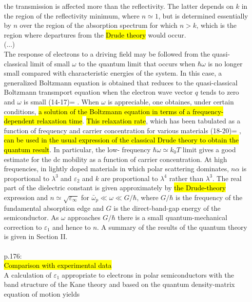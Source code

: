 the transmission is affected more than the reflectivity. The latter depends on
$k$ in the region of the reflectivity minimum, where $n \simeq 1$, but is determined 
essentially by $n$ over the region of the absorption spectrum for which $n > k$,
which is the region where departures from the \hl{Drude theory} would occur.
\\
(...)
\\
The response of electrons to a driving field may be followed from the quasi-classical
limit of small $\omega$ to the quantum limit that occurs when $\hbar \omega$ is no longer small
compared with characteristic energies of the system. In this case, a generalized Boltzmann equation
is obtained that reduces to the quasi-classical Boltzmann transmport equation when the electron wave 
vector $q$ tends to zero and $\omega$ is small (14-17)=
\cite{Jensen1975,Price1966,Argyres1961,Kohn1958}
. When $\omega$ is appreciable, one obtaines,
under certain conditions, \hl{a solution of the Boltzmann equation in terms of a frequency-dependent
relaxation time}. \hl{This relaxation rate}, which has been tabulated as a function of frequency and 
carrier concentration for various materials (18-20)=
\cite{Jensen1977,Jensen1979,Jensen1981}
, \hl{can be used in the usual expression of the 
classical Drude theory to obtain the quantum result}. In particular, the low-
frequency $\hbar\omega \simeq k_0T$ limit gives a good estimate for the dc mobility as a function
of carrier concentration. At high frequencies, in lightly doped materials in which
polar scattering dominates, $n\alpha$ is proportional to $\lambda^3$ and $\varepsilon_2$ and $k$
are proportional to $\lambda^4$ rather than $\lambda^3$. The real part of the dielectric constant
is given approximately by \hl{the Drude-theory} expression and $n \simeq \sqrt{\varepsilon_{\infty}}$
for $\bar\omega_p \ll \omega \ll G/\hbar$, where $G/\hbar$ is the frequency of the fundamental absorption
edge and $G$ is the direct-band-gap energy of the semiconductor. As $\omega$ approaches $G/\hbar$ there
is a small quantum-mechanical correction to $\varepsilon_1$ and hence to $n$.
A summary of the results of the quantum theory is given in Section II.
\\
\\
p.176:\\
\hl{Comparison with experimental data}\\
A calculation of $\varepsilon_1$ appropriate to electrons in polar semiconductors with the
band structure of the Kane theory and based on the quantum density-matrix equation of motion yields 
